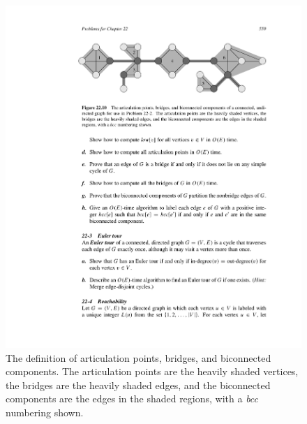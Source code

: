 \documentclass[12pt,a4paper]{article}
\theoremstyle{definition}
\begin{document}
\begin{enumerate}
	 \begin{figure}[htbp]
	 	
		\centering
		\includegraphics[width=6in]{Fig-Definition.pdf}
		\caption{The definition of articulation points, bridges, and biconnected components. The articulation points are the heavily shaded vertices, the bridges are the heavily shaded edges, and the biconnected components are the edges in the shaded regions, with a \textit{bcc} numbering shown.}
		\label{def}
	\end{figure}
	

\end{enumerate}
\end{document}
